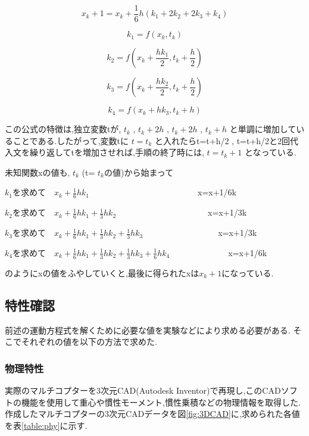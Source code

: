 \documentclass[12pt,oneside]{sotsuken_paper}
\begin{document}
\begin{equation}
	x_k+1 = x_k+\frac{1}{6}h(k_1+2k_2+2k_3+k_4)
	\label{eq1}
\end{equation}

\begin{equation}
	k_1 = f(x_k,t_k)
	\label{eq2}
\end{equation}

\begin{equation}
	k_2 = f(x_k+\frac{hk_1}{2},t_k+\frac{h}{2})
	\label{eq3}
\end{equation}

\begin{equation}
	k_3 = f(x_k+\frac{hk_2}{2},t_k+\frac{h}{2})
	\label{eq4}
\end{equation}

\begin{equation}
	k_4 = f(x_k+hk_3,t_k+h)
	\label{eq5}
\end{equation}

この公式の特徴は,独立変数tが, \(t_k\) , \(t_k+2h\) , \(t_k+2h\) , \(t_k+h\) と単調に増加していることである.したがって,変数tに \(t=t_k\) と入れたらt=t+h/2 , t=t+h/2と2回代入文を繰り返してtを増加させれば,手順の終了時には, \(t=t_k+1\) となっている.


未知関数xの値も, \(t_k\) (t= \(t_k\)の値)から始まって

\(k_1\)を求めて　\(x_k+\frac{1}{6}hk_1\)　　　　　　　　　　　　　x=x+1/6k


\(k_2\)を求めて　\(x_k+\frac{1}{6}hk_1+\frac{1}{3}hk_2\)　　　　　　　　　　　x=x+1/3k


\(k_3\)を求めて　\(x_k+\frac{1}{6}hk_1+\frac{1}{3}hk_2+\frac{1}{3}hk_3\)　　　　　　　　　x=x+1/3k


\(k_4\)を求めて　\(x_k+\frac{1}{6}hk_1+\frac{1}{3}hk_2+\frac{1}{3}hk_3+\frac{1}{6}hk_4\)　　　　　　　x=x+1/6k

のようにxの値をふやしていくと,最後に得られたxは\(x_k+1\)になっている.\cite{runge} 

\subsection{特性確認}
前述の運動方程式を解くために必要な値を実験などにより求める必要がある.
そこでそれぞれの値を以下の方法で求めた.

\subsubsection{物理特性}
実際のマルチコプターを3次元CAD(Autodesk Inventor)で再現し,このCADソフトの機能を使用して重心や慣性モーメント,慣性乗積などの物理情報を取得した.
作成したマルチコプターの3次元CADデータを図\ref{fig:3DCAD}に,求められた各値を表\ref{table:phy}に示す.
\end{document}
